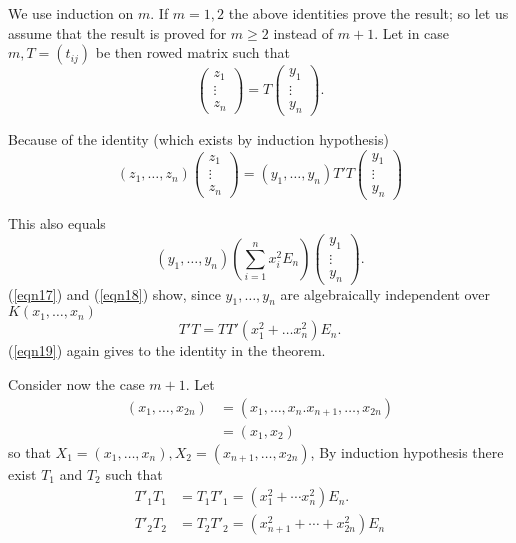 \begin{Proof}
We use induction on $m$. If $m=1,2$ the above identities prove the
result; so let us assume that the result is proved for $m\geq 2$
instead of $m+1$. Let in case $m, T=(t_{ij})$ be then rowed matrix
such that
$$
\begin{pmatrix}z_1\\\vdots\\z_n\end{pmatrix}=T\begin{pmatrix}y_1\\\vdots\\y_n\end{pmatrix}.
$$

Because of the identity (which exists by induction hypothesis)
\begin{equation}\label{eqn17}
(z_1,\ldots,z_n) \begin{pmatrix}z_1\\\vdots\\z_n\end{pmatrix} = (y_1,\ldots,y_n)T'T\begin{pmatrix}y_1\\\vdots\\y_n\end{pmatrix}
\end{equation}

This also equals
\begin{equation}\label{eqn18}
(y_1,\ldots,y_n)\left(\sum\limits_{i=1}^{n}x^{2}_iE_n\right) \begin{pmatrix}y_1\\\vdots\\y_n\end{pmatrix}.
\end{equation}
(\ref{eqn17}) and (\ref{eqn18}) show, since $y_1,\ldots,y_n$ are
algebraically independent over $K(x_1,\ldots,x_n)$
\begin{equation}\label{eqn19}
T'T=TT'\left(x^{2}_1+\ldots x^{2}_n\right)E_n.
\end{equation}
(\ref{eqn19}) again gives to the identity in the theorem.

Consider now the case $m+1$. Let
\begin{align*}
(x_1,\ldots,x_{2n})&=(x_1,\ldots,x_n. x_{n+1},\ldots,x_{2n})\\
&=(x_1, x_2)
\end{align*}
so that $X_1=(x_1,\ldots,x_n), X_2=(x_{n+1},\ldots,x_{2n})$, By
induction hypothesis there exist $T_1$ and $T_2$ such that 
\begin{align*}
T'_1T_1&=T_1T'_1=\left(x^{2}_1+\cdots x^{2}_n\right)E_n.\\
T'_2T_2&=T_2T'_2=\left(x^{2}_{n+1}+\cdots+x^{2}_{2n}\right)E_n
\end{align*}


\end{Proof}
